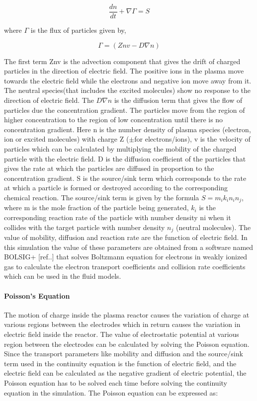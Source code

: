 \documentclass[11pt]{article}
\begin{document}
\begin{equation}
\frac{dn}{ dt}+ \nabla  \Gamma = S
\end{equation}

where \(\Gamma\) is the flux of particles given by,

\begin{equation}
\Gamma  =(Z nv-D \nabla n )
\end{equation}

The first term Znv is the advection component that gives the drift of
charged particles in the direction of electric field. The positive ions
in the plasma move towards the electric field while the electrons and
negative ion move away from it. The neutral species(that includes the
excited molecules) show no response to the direction of electric field.
The \(D\nabla n\) is the diffusion term that gives the flow of particles
due the concentration gradient. The particles move from the region of
higher concentration to the region of low concentration until there is
no concentration gradient. Here n is the number density of plasma
species (electron, ion or excited molecules) with charge Z (\(\pm\)for
electrons/ions), v is the velocity of particles which can be calculated
by multiplying the mobility of the charged particle with the electric
field. D is the diffusion coefficient of the particles that gives the
rate at which the particles are diffused in proportion to the
concentration gradient. S is the source/sink term which corresponds to
the rate at which a particle is formed or destroyed according to the
corresponding chemical reaction. The source/sink term is given by the
formula \(S=m_ik_in_in_j\), where m is the mole fraction of the particle
being generated, \(k_i\) is the corresponding reaction rate of the
particle with number density ni when it collides with the target
particle with number density \(n_j\) (neutral molecules). The value of
mobility, diffusion and reaction rate are the function of electric
field. In this simulation the value of these parameters are obtained
from a software named BOLSIG+ {[}ref..{]} that solves Boltzmann equation
for electrons in weakly ionized gas to calculate the electron transport
coefficients and collision rate coefficients which can be used in the
fluid models.

\paragraph{Poisson's Equation}\label{poissons-equation}

The motion of charge inside the plasma reactor causes the variation of
charge at various regions between the electrodes which in return causes
the variation in electric field inside the reactor. The value of
electrostatic potential at various region between the electrodes can be
calculated by solving the Poisson equation. Since the transport
parameters like mobility and diffusion and the source/sink term used in
the continuity equation is the function of electric field, and the
electric field can be calculated as the negative gradient of electric
potential, the Poisson equation has to be solved each time before
solving the continuity equation in the simulation. The Poisson equation
can be expressed as:
\end{document}
